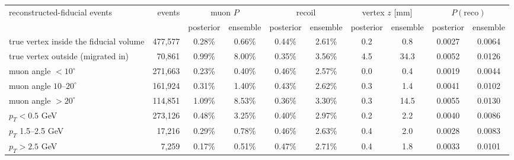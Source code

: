 \begin{tabular}{lrcccccccc}
\toprule
reconstructed-fiducial events & events & \multicolumn{2}{c}{muon $P$} & \multicolumn{2}{c}{recoil} & \multicolumn{2}{c}{vertex $z$ [mm]} & \multicolumn{2}{c}{$P(\mathrm{reco})$} \\
 & & posterior & ensemble & posterior & ensemble & posterior & ensemble & posterior & ensemble \\
\midrule
true vertex inside the fiducial volume & 477{,}577 & 0.28\% & 0.66\% & 0.44\% & 2.61\% & 0.2 & 0.8 & 0.0027 & 0.0064 \\
true vertex outside (migrated in) & 70{,}861 & 0.99\% & 8.00\% & 0.35\% & 3.56\% & 4.5 & 34.3 & 0.0052 & 0.0126 \\
muon angle $< 10^\circ$ & 271{,}663 & 0.23\% & 0.40\% & 0.46\% & 2.57\% & 0.0 & 0.4 & 0.0019 & 0.0044 \\
muon angle $10$--$20^\circ$ & 161{,}924 & 0.31\% & 1.40\% & 0.43\% & 2.62\% & 0.3 & 1.4 & 0.0041 & 0.0102 \\
muon angle $> 20^\circ$ & 114{,}851 & 1.09\% & 8.53\% & 0.36\% & 3.30\% & 0.3 & 14.5 & 0.0055 & 0.0130 \\
$p_T < 0.5$ GeV & 273{,}126 & 0.48\% & 3.25\% & 0.40\% & 2.97\% & 0.2 & 2.2 & 0.0040 & 0.0086 \\
$p_T$ 1.5--2.5 GeV & 17{,}216 & 0.29\% & 0.78\% & 0.46\% & 2.63\% & 0.4 & 2.0 & 0.0028 & 0.0083 \\
$p_T > 2.5$ GeV & 7{,}259 & 0.17\% & 0.51\% & 0.47\% & 2.71\% & 0.4 & 1.8 & 0.0033 & 0.0101 \\
\bottomrule
\end{tabular}
